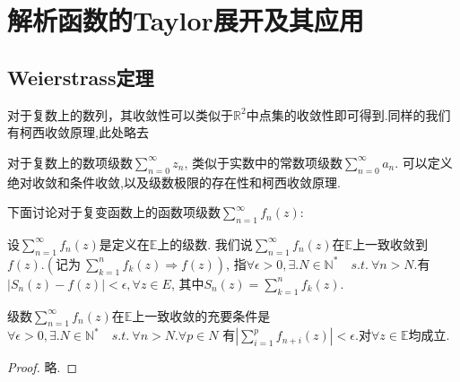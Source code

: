 \chapter{解析函数的{\rm Taylor}展开及其应用}
\section{Weierstrass定理}
    对于复数上的数列，其收敛性可以类似于$\mathbb{R}^2$中点集的收敛性即可得到.同样的我们有柯西收敛原理,此处略去\par
    对于复数上的数项级数$\displaystyle{\sum\limits_{n=0}^\infty z_n}$, 
    类似于实数中的常数项级数$\displaystyle{\sum\limits_{n=0}^\infty a_n}$.
    可以定义绝对收敛和条件收敛,以及级数极限的存在性和柯西收敛原理.\par
    下面讨论对于复变函数上的函数项级数$\displaystyle{\sum\limits_{n=1}^\infty f_n(z)}$:

\begin{theorem}
    设$\displaystyle{\sum\limits_{n=1}^\infty f_n(z)}$是定义在$\mathbb{E}$上的级数.
    我们说$\displaystyle{\sum\limits_{n=1}^\infty f_n(z)}$在$\mathbb{E}$上一致收敛到
    $f(z)$.$(\mbox{记为}\ \displaystyle{\sum\limits_{k=1}^n f_k(z)\Rightarrow f(z)})$,
    指$\forall\epsilon>0,\exists.N\in \mathbb{N}^*\quad s.t.\ \forall n>N$.有$\left|S_n(z)-f(z)\right|<\epsilon, \forall z\in E$,
    其中$\displaystyle{S_n(z)=\sum\limits_{k=1}^n f_k(z)}$.
\end{theorem}

\begin{theorem}
    级数$\displaystyle{\sum\limits_{n=1}^\infty f_n(z)}$在$\mathbb{E}$上一致收敛的充要条件是
    $\forall\epsilon>0,\exists.N\in \mathbb{N}^*\quad s.t.\ \forall n>N.\forall p\in N$
    有$\displaystyle{\left|\sum\limits_{i=1}^pf_{n+i}(z)\right|<\epsilon}$.对$\forall z\in\mathbb{E}$均成立.
\end{theorem}
\begin{proof}
    略.
\end{proof}

\begin{theorem}[函数项级数的weierstass判别法，略]
\end{theorem}

